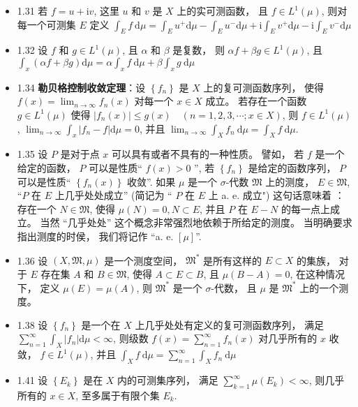 \begin{itemize}
\item 1.31 若 $f=u+\mathrm{i} v$, 这里 $u$ 和 $v$ 是 $X$ 上的实可测函数， 且 $f \in L^{1}(\mu)$, 则对每一个可测集 $E$ 定义 $\int_{E} f \mathrm{~d} \mu=\int_{E} u^{+} \mathrm{d} \mu-\int_{E} u^{-} \mathrm{d} \mu+\mathrm{i} \int_{E} v^{+} \mathrm{d} \mu-\mathrm{i} \int_{E} v^{-} \mathrm{d} \mu$

\item 1.32 设 $f$ 和 $g \in L^{1}(\mu)$, 且 $\alpha$ 和 $\beta$ 是复数， 则 $\alpha f+\beta g \in L^{1}(\mu)$, 且 $\int_{x}(\alpha f+\beta g) \mathrm{d} \mu=\alpha \int_{x} f \mathrm{~d} \mu+\beta \int_{x} g \mathrm{~d} \mu$

\item 1.34 \textbf{勒贝格控制收敛定理}：设 $\left\{f_{n}\right\}$ 是 $X$ 上的复可测函数序列， 使得 $f(x)=\lim _{n \rightarrow \infty} f_{n}(x)$ 对每一个 $x \in X$ 成立。 若存在一个函数 $g \in L^{1}(\mu)$ 使得 $\left|f_{n}(x)\right| \leqslant g(x) \quad(n=1,2,3, \cdots ; x \in X)$, 则 $f \in L^{1}(\mu)$, $\lim _{n \rightarrow \infty} \int_{x}\left|f_{n}-f\right| \mathrm{d} \mu=0$, 并且 $\lim _{n \rightarrow \infty} \int_{X} f_{n} \mathrm{~d} \mu=\int_{X} f \mathrm{~d} \mu$.

\item 1.35 设 $P$ 是对于点 $x$ 可以具有或者不具有的一种性质。 譬如， 若 $f$ 是一个给定的函数， $P$ 可以是性质“ $f(x)>0$ ”, 若 $\left\{f_{n}\right\}$ 是给定的函数序列， $P$ 可以是性质“ $\left\{f_{n}(x)\right\}$ 收敛”. 如果 $\mu$ 是一个 $\sigma$-代数 $\mathfrak{M}$ 上的测度， $E \in \mathfrak{M}$, “$P$ 在 $E$ 上几乎处处成立” (简记为 “ $P$ 在 $E$ 上 a. e. 成立") 这句话意味着 ： 存在一个 $N \in \mathfrak{M}$, 使得 $\mu(N)=0, N \subset E$, 并且 $P$ 在 $E-N$ 的每一点上成立。 当然 “几乎处处” 这个概念非常强烈地依赖于所给定的测度。 当明确要求指出测度的时侯， 我们将记作 “a. e. $[\mu]$”.

\item 1.36 设 $(X, \mathfrak{M}, \mu)$ 是一个测度空间， $\mathfrak{M}^*$  是所有这样的 $E \subset X$ 的集族， 对于 $E$ 存在集 $A$ 和 $B \in \mathfrak{M}$, 使得 $A \subset E \subset B$, 且 $\mu(B-A)=0$, 在这种情况下， 定义 $\mu(E)=\mu(A)$, 则 $\mathfrak{M}^{*}$ 是一个 $\sigma$-代数， 且 $\mu$ 是 $\mathfrak{M}^{*}$ 上的一个测度。

\item 1.38 设 $\left\{f_{n}\right\}$ 是一个在 $X$ 上几乎处处有定义的复可测函数序列， 满足 $\sum_{n=1}^{\infty} \int_{X}\left|f_{n}\right| \mathrm{d} \mu<\infty$, 则级数 $f(x)=\sum_{n=1}^{\infty} f_{n}(x)$ 对几乎所有的 $x$ 收敛， $f \in L^{1}(\mu)$, 并且 $\int_{X} f \mathrm{~d} \mu=\sum_{n=1}^{\infty} \int_{X} f_{n} \mathrm{~d} \mu$

\item 1.41 设 $\left\{E_{k}\right\}$ 是在 $X$ 内的可测集序列， 满足 $\sum_{k=1}^{\infty} \mu\left(E_{k}\right)<\infty$, 则几乎所有的 $x \in X$, 至多属于有限个集 $E_{k}$.
\end{itemize}

